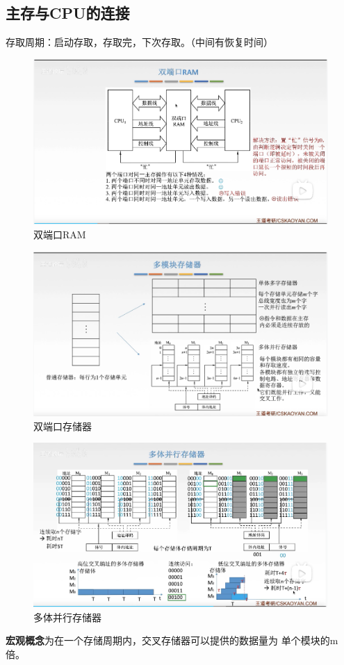 \documentclass[12pt]{ctexart}
\begin{document}
\subsection{主存与CPU的连接}
存取周期：启动存取，存取完，下次存取。（中间有恢复时间）
\begin{figure}[htbp]
    \centering
    \includegraphics[scale=0.6]{双端口RAM.png}
    \caption{双端口RAM}
    \end{figure}
\begin{figure}[htbp]
    \centering
    \includegraphics[scale=0.6]{多模块存储器.png}
    \caption{双端口存储器}
    \end{figure}
\begin{figure}[htbp]
    \centering
    \includegraphics[scale=0.6]{多体并行存储器.png}
    \caption{多体并行存储器}
    \end{figure}
\textbf{宏观概念}为在一个存储周期内，交叉存储器可以提供的数据量为
单个模块的m倍。
\end{document}

